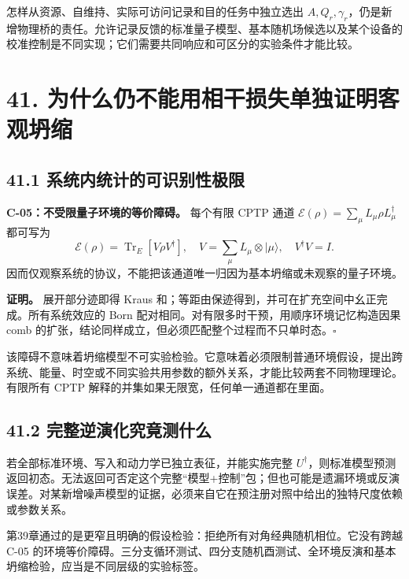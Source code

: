 \documentclass[
  11pt,
  oneside]{book}
\begin{document}
怎样从资源、自维持、实际可访问记录和目的任务中独立选出
\(A,Q_r,\gamma_r\)，仍是新增物理桥的责任。允许记录反馈的标准量子模型、基本随机场候选以及某个设备的校准控制是不同实现；它们需要共同响应和可区分的实验条件才能比较。

\hypertarget{ch-41}{%
\chapter{41. 为什么仍不能用相干损失单独证明客观坍缩}\label{ch-41}}

\hypertarget{ux7cfbux7edfux5185ux7edfux8ba1ux7684ux53efux8bc6ux522bux6027ux6781ux9650}{%
\section{41.1
系统内统计的可识别性极限}\label{ux7cfbux7edfux5185ux7edfux8ba1ux7684ux53efux8bc6ux522bux6027ux6781ux9650}}

\protect\hypertarget{c-05}{}{}

\textbf{C-05：不受限量子环境的等价障碍。} 每个有限 CPTP 通道
\(\mathcal E(\rho)=\sum_\mu L_\mu\rho L_\mu^\dagger\) 都可写为 \[
\mathcal E(\rho)=\operatorname{Tr}_E[V\rho V^\dagger],
\quad V=\sum_\mu L_\mu\otimes|\mu\rangle,\quad V^\dagger V=I.
\tag{41.1}
\]
因而仅观察系统的协议，不能把该通道唯一归因为基本坍缩或未观察的量子环境。

\textbf{证明。} 展开部分迹即得 Kraus
和；等距由保迹得到，并可在扩充空间中幺正完成。所有系统效应的 Born
配对相同。对有限多时干预，用顺序环境记忆构造因果 comb
的扩张，结论同样成立，但必须匹配整个过程而不只单时态。\(\square\)

该障碍不意味着坍缩模型不可实验检验。它意味着必须限制普通环境假设，提出跨系统、能量、时空或不同实验共用参数的额外关系，才能比较两套不同物理理论。有限所有
CPTP 解释的并集如果无限宽，任何单一通道都在里面。

\hypertarget{ux5b8cux6574ux9006ux6f14ux5316ux7a76ux7adfux6d4bux4ec0ux4e48}{%
\section{41.2
完整逆演化究竟测什么}\label{ux5b8cux6574ux9006ux6f14ux5316ux7a76ux7adfux6d4bux4ec0ux4e48}}

若全部标准环境、写入和动力学已独立表征，并能实施完整
\(U^\dagger\)，则标准模型预测返回初态。无法返回可否定这个完整``模型+控制''包；但也可能是遗漏环境或反演误差。对某新增噪声模型的证据，必须来自它在预注册对照中给出的独特尺度依赖或参数关系。

第39章通过的是更窄且明确的假设检验：拒绝所有对角经典随机相位。它没有跨越
C-05
的环境等价障碍。三分支循环测试、四分支随机酉测试、全环境反演和基本坍缩检验，应当是不同层级的实验标签。
\end{document}
